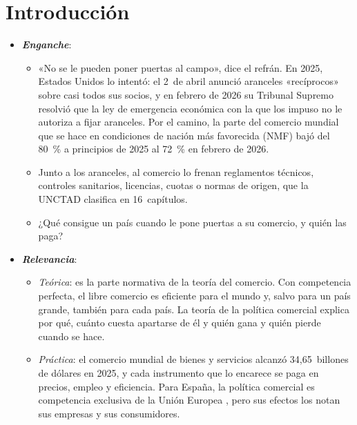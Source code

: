 \documentclass[11pt]{article}
\begin{document}
\tceetitulo

\section*{Introducción}

\begin{itemize}
\item \textbf{\emph{Enganche}}:
  \begin{itemize}
  \item «No se le pueden poner puertas al campo», dice el refrán. En 2025, Estados Unidos lo intentó: el 2~de abril anunció aranceles «recíprocos» sobre casi todos sus socios, y en febrero de 2026 su Tribunal Supremo resolvió que la ley de emergencia económica con la que los impuso no le autoriza a fijar aranceles\nocite{JonesDay2026IEEPA}. Por el camino, la parte del comercio mundial que se hace en condiciones de nación más favorecida (NMF) bajó del 80~\% a principios de 2025 al 72~\% en febrero de 2026\nocite{OMC2026Perspectivas}.
  \item Junto a los aranceles, al comercio lo frenan reglamentos técnicos, controles sanitarios, licencias, cuotas o normas de origen, que la UNCTAD clasifica en 16~capítulos\nocite{UNCTAD2019ClasificacionMNA}.
  \item ¿Qué consigue un país cuando le pone puertas a su comercio, y quién las paga?
  \end{itemize}

\item \textbf{\emph{Relevancia}}:
  \begin{itemize}
  \item \emph{Teórica}: es la parte normativa de la teoría del comercio. Con competencia perfecta, el libre comercio es eficiente para el mundo y, salvo para un país grande, también para cada país. La teoría de la política comercial explica por qué, cuánto cuesta apartarse de él y quién gana y quién pierde cuando se hace.
  \item \emph{Práctica}: el comercio mundial de bienes y servicios alcanzó 34,65~billones de dólares en 2025\nocite{OMC2026Perspectivas}, y cada instrumento que lo encarece se paga en precios, empleo y eficiencia. Para España, la política comercial es competencia exclusiva de la Unión Europea , pero sus efectos los notan sus empresas y sus consumidores.
  \end{itemize}


\end{itemize}
\end{document}
